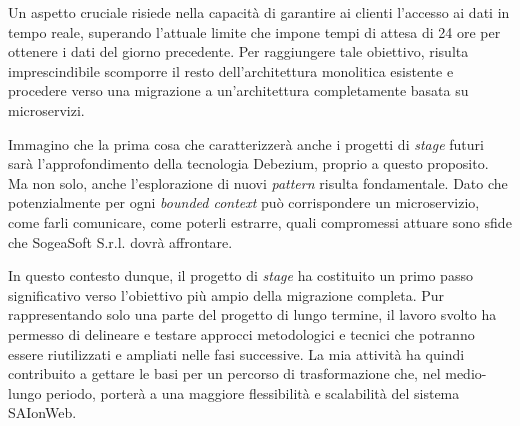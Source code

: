     \vspace{0.2 em}
    \noindent Un aspetto cruciale risiede nella capacità di garantire ai clienti l’accesso ai dati in tempo reale, superando l’attuale limite che impone tempi di attesa di 24 ore per ottenere i dati del giorno precedente. Per raggiungere tale obiettivo, risulta imprescindibile scomporre il resto dell'architettura monolitica esistente e procedere verso una migrazione a un’architettura completamente basata su microservizi.  

    \vspace{0.2 em}
    \noindent Immagino che la prima cosa che caratterizzerà anche i progetti di \textit{stage} futuri sarà l'approfondimento della tecnologia Debezium, proprio a questo proposito. Ma non solo, anche l'esplorazione di nuovi \textit{pattern} risulta fondamentale. Dato che potenzialmente per ogni \textit{bounded context} può corrispondere un microservizio, come farli comunicare, come poterli estrarre, quali compromessi attuare sono sfide che SogeaSoft S.r.l. dovrà affrontare. 

     \vspace{0.2 em}
     \noindent In questo contesto dunque, il progetto di \textit{stage} ha costituito un primo passo significativo verso l’obiettivo più ampio della migrazione completa. Pur rappresentando solo una parte del progetto di lungo termine, il lavoro svolto ha permesso di delineare e testare approcci metodologici e tecnici che potranno essere riutilizzati e ampliati nelle fasi successive. La mia attività ha quindi contribuito a gettare le basi per un percorso di trasformazione che, nel medio-lungo periodo, porterà a una maggiore flessibilità e scalabilità del sistema SAIonWeb.
    
    
    